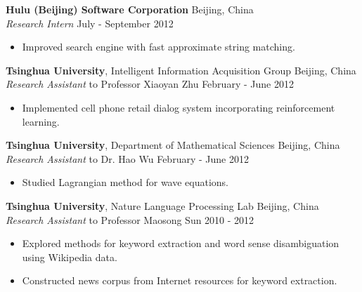 \documentclass[a4paper,11pt]{article} %
\begin{document}

\textbf{Hulu (Beijing) Software Corporation} \hfill Beijing, China \\
\textit{Research Intern} \hfill July - September 2012
\vspace{-\parskip}
\begin{itemize}
  \item Improved search engine with fast approximate string matching.
\end{itemize}



\textbf{Tsinghua University}, Intelligent Information Acquisition Group \hfill Beijing, China \\
\textit{Research Assistant} to Professor Xiaoyan Zhu \hfill February - June 2012
\vspace{-\parskip}
\begin{itemize}
  \item Implemented cell phone retail dialog system incorporating reinforcement learning.
\end{itemize}


\textbf{Tsinghua University}, Department of Mathematical Sciences \hfill Beijing, China \\
\textit{Research Assistant} to Dr. Hao Wu \hfill February - June 2012
\vspace{-\parskip}
\begin{itemize}
  \item Studied Lagrangian method for wave equations.
\end{itemize}


\textbf{Tsinghua University}, Nature Language Processing Lab \hfill Beijing, China \\
\textit{Research Assistant} to Professor Maosong Sun \hfill 2010 - 2012
\vspace{-\parskip}
\begin{itemize}
  \item Explored methods for keyword extraction and word sense disambiguation using Wikipedia data.
  \item Constructed news corpus from Internet resources for keyword extraction.
\end{itemize}

\end{document}
